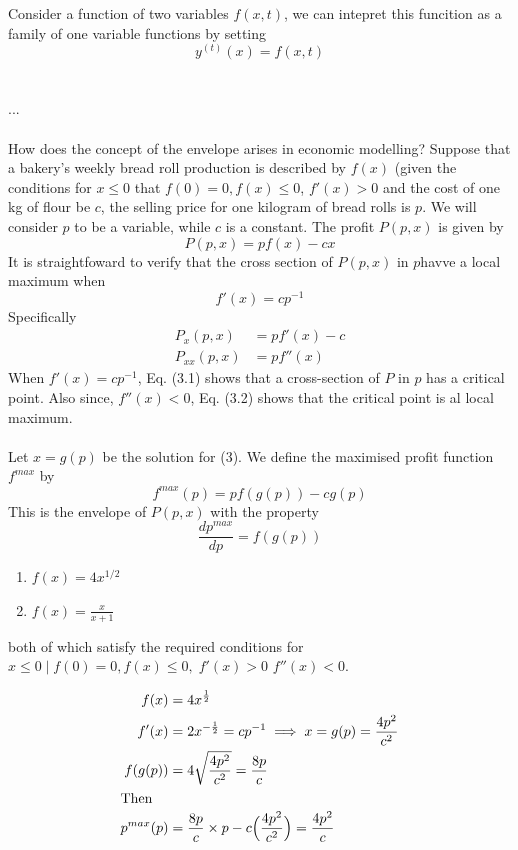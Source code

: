 Consider a function of two variables \( f(x,t) \), we can intepret this
funcition as a family of one variable functions by setting
\[ 
  y^{(t)}(x) = f(x,t)
\]
\\\\
...
\\\\
How does the concept of the envelope arises in economic modelling? Suppose that
a bakery's weekly bread roll production is described by \( f(x) \) (given the
conditions for \( x \leq 0 \) that \( f(0) = 0, f(x) \leq 0 \), \( f'(x) > 0 \)
and the cost of one kg of flour be \( c \), the selling price for one kilogram
of bread rolls is \( p \). We will consider \( p \) to be a variable, while \(
c\) is a constant. The profit \( P(p,x) \) is given by
\[ 
  P(p,x) = pf(x) - cx
\]
It is straightfoward to verify that the cross section of \( P(p,x) \) in \(
p  \)havve a local maximum when
\[ 
  f'(x) = cp^{-1}
\]
Specifically
\begin{align}
  P_x(p,x) &= pf'(x) - c\\
  P_{xx}(p,x) &= pf''(x)
\end{align}
When \( f'(x) = cp^{-1} \), Eq. (3.1) shows that a cross-section of \( P \) in
\( p \) has a critical point. Also since, \( f''(x) < 0 \), Eq. (3.2) shows
that the critical point is al local maximum.
\\\\
Let \( x = g(p) \) be the solution for (3). We define the maximised profit
function \( f^{max} \) by 
\[ 
  f^{max}(p) = pf(g(p)) - cg(p)
\]
This is the envelope of \( P(p,x) \) with the property
\[ 
  \frac{dp^{max}}{dp} = f(g(p))
\]

\begin{enumerate}
  \item \( f(x) = 4x^{1/2} \)
  \item \( f(x) = \frac{x}{x+1} \)
\end{enumerate}

both of which satisfy the required conditions for \( x \leq 0 \mid f(0) = 0,
f(x) \leq 0, \; f'(x) > 0 \) \( f''(x) < 0 \).

\begin{align*}
  f(x) &= 4x^{ \frac{1}{2} }\\
  f'(x) &= 2x^{-\frac{1}{2}} = cp^{-1} \implies x = g(p) = \frac{4p^2}{c^2}\\
  f(g(p)) &= 4 \sqrt{ \frac{4p^2}{c^2}} = \frac{8p}{c}\\
  \intertext{Then}
  p^{max} (p) &= \frac{8p}{c} \times p - c \Big( \frac{4p^2}{c^2}\Big )
  = \frac{4p^2}{c}
\end{align*}





